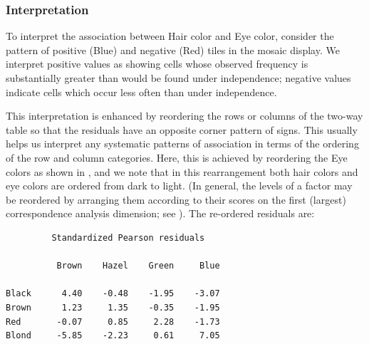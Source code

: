 \subsubsection{Interpretation}

To interpret the association between Hair color and Eye color,
consider the pattern of positive (Blue) and negative (Red)
tiles in the mosaic display.  
We interpret positive values as showing cells whose observed frequency
is substantially greater than would be found under independence;
negative values indicate cells which occur less often than
under independence.

This interpretation is enhanced by reordering the rows or columns
of the two-way table so that the residuals have an opposite
corner pattern of signs.  This usually helps us interpret any systematic
patterns of association in terms of the ordering of the row and column
categories.
Here, this is achieved by reordering the Eye colors as shown in
,  and we note that in this rearrangement
both hair colors and eye colors are ordered from dark to light.
(In general, the levels of a factor may be reordered by
arranging them according to their scores on the first (largest)
correspondence analysis dimension; see
\citep{Friendly:94a}).
The re-ordered residuals are:
\begin{verbatim} 
         Standardized Pearson residuals

          Brown    Hazel    Green     Blue

Black      4.40    -0.48    -1.95    -3.07
Brown      1.23     1.35    -0.35    -1.95
Red       -0.07     0.85     2.28    -1.73
Blond     -5.85    -2.23     0.61     7.05
\end{verbatim}
